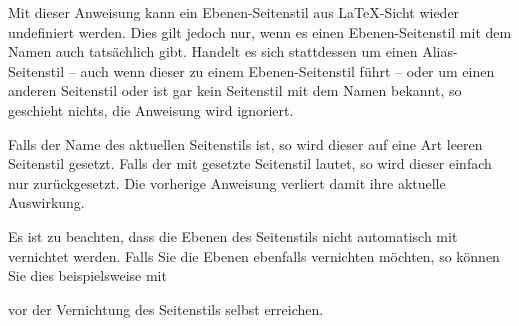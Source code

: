\begin{Declaration}
\end{Declaration}
%
%
\iffalse%
Mit der Anweisung wird ein Ebenen-Seitenstil aus \LaTeX-Sicht undefiniert.
Wurde statt eines Ebenen-Seitenstils ein Alias-Seitenstil, ein anderer
Seitenstil oder ein unbekannter Seitenstil angegeben, so wird die Anweisung
ignoriert.%
\else%
Mit dieser Anweisung kann ein Ebenen-Seitenstil aus \LaTeX-Sicht wieder
undefiniert werden. Dies gilt jedoch nur, wenn es einen Ebenen-Seitenstil mit
dem Namen  auch tatsächlich gibt. Handelt es sich
stattdessen um einen Alias-Seitenstil -- auch wenn dieser zu einem
Ebenen-Seitenstil führt -- oder um einen anderen Seitenstil oder ist gar kein
Seitenstil mit dem Namen  bekannt, so geschieht
nichts, die Anweisung wird ignoriert.%
\fi

Falls  der Name des aktuellen Seitenstils ist,
so wird dieser auf eine Art leeren Seitenstil gesetzt. Falls der mit
 gesetzte Seitenstil
 lautet, so wird dieser einfach nur
zurückgesetzt. Die vorherige Anweisung 
verliert damit ihre aktuelle Auswirkung.

Es ist zu beachten, dass die Ebenen des Seitenstils nicht
automatisch mit vernichtet werden. Falls Sie die Ebenen ebenfalls vernichten
möchten, so können Sie dies beispielsweise mit
\begin{lstcode}
\end{lstcode}
vor der Vernichtung des Seitenstils selbst erreichen.%
\EndIndexGroup
\EndIndexGroup


%
\EndIndexGroup


